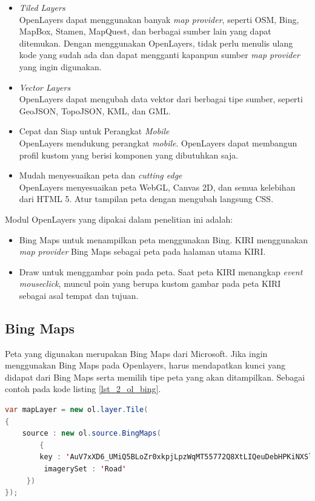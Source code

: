\begin{itemize}
\item \textit{Tiled Layers}\\
			OpenLayers dapat menggunakan banyak \textit{map provider}, seperti OSM, Bing, MapBox, Stamen, MapQuest, dan berbagai sumber lain yang dapat ditemukan. Dengan menggunakan OpenLayers, tidak perlu menulis ulang kode yang sudah ada dan dapat mengganti kapanpun sumber \textit{map provider} yang ingin digunakan.
	\item \textit{Vector Layers}\\
			OpenLayers dapat mengubah data vektor dari berbagai tipe sumber, seperti GeoJSON, TopoJSON, KML, dan GML.
	\item Cepat dan Siap untuk Perangkat \textit{Mobile}\\
			OpenLayers mendukung perangkat \textit{mobile}. OpenLayers dapat membangun profil kustom yang berisi komponen yang dibutuhkan saja.
	\item Mudah menyesuaikan peta dan \textit{cutting edge}\\
			OpenLayers menyesuaikan peta WebGL, Canvas 2D, dan semua kelebihan dari HTML 5. Atur tampilan peta dengan mengubah langsung CSS.
\end{itemize}

Modul OpenLayers yang dipakai dalam penelitian ini adalah:
\begin{itemize}
	\item 	Bing Maps untuk menampilkan peta menggunakan Bing. KIRI menggunakan \textit{map provider} Bing Maps sebagai peta pada halaman utama KIRI. 
	\item Draw untuk menggambar poin pada peta. Saat peta KIRI menangkap \textit{event mouseclick}, muncul poin yang berupa kustom gambar pada peta KIRI sebagai asal tempat dan tujuan. 
\end{itemize}

\subsection{Bing Maps}
Peta yang digunakan merupakan Bing Maps dari Microsoft. Jika ingin menggunakan Bing Maps pada Openlayers, harus mendapatkan kunci yang didapat dari Bing Maps serta memilih tipe peta yang akan ditampilkan. Sebagai contoh pada kode listing \ref{lst_2_ol_bing}.

\begin{lstlisting}[caption=Penggunaan Bing Maps pada Openlayers,label = {lst_2_ol_bing},language=Java]
var mapLayer = new ol.layer.Tile(
{
	source : new ol.source.BingMaps(
    	{
     	key : 'AuV7xXD6_UMiQ5BLoZr0xkpjLpzWqMT55772Q8XtLIQeuDebHPKiNXSlZXxEr1GA',
         imagerySet : 'Road'
     })
});
\end{lstlisting}

